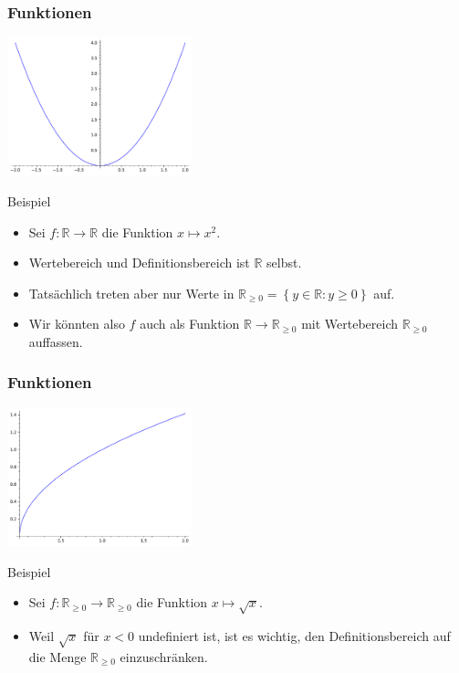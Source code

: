 \documentclass{beamer}
\newcommand\RR{\mathbb R}
\newcommand\cbc[1]{\left\{{#1}\right\}}
\renewcommand{\ae}{\"a}
\renewcommand{\oe}{\"o}
\newcommand{\ue}{\"u}
\newcommand{\mytitle}{Funktionen}
\begin{document}
\begin{frame}\frametitle{\mytitle}
	\hfill\includegraphics[height=40mm]{pics/graph_quad.pdf}
	\begin{block}{Beispiel}
		\begin{itemize}
			\item Sei $f:\RR\to \RR$ die Funktion $x\mapsto x^2$.
			\item Wertebereich und Definitionsbereich ist $\RR$ selbst.
			\item Tats\ae chlich treten aber nur Werte in $\RR_{\geq0}=\cbc{y\in\RR:y\geq0}$ auf.
			\item Wir k\oe nnten also $f$ auch als Funktion $\RR\to\RR_{\geq0}$ mit Wertebereich $\RR_{\geq0}$ auffassen.
		\end{itemize}
	\end{block}
\end{frame}

\begin{frame}\frametitle{\mytitle}
	\hfill\includegraphics[height=40mm]{pics/graph_root.pdf}
	\begin{block}{Beispiel}
		\begin{itemize}
			\item Sei $f:\RR_{\geq0}\to \RR_{\geq0}$ die Funktion $x\mapsto\sqrt x$.
			\item Weil $\sqrt x$ f\ue r $x<0$ undefiniert ist, ist es wichtig, den Definitionsbereich auf die Menge $\RR_{\geq0}$ einzuschr\ae nken.
		\end{itemize}
	\end{block}
\end{frame}
\end{document}
